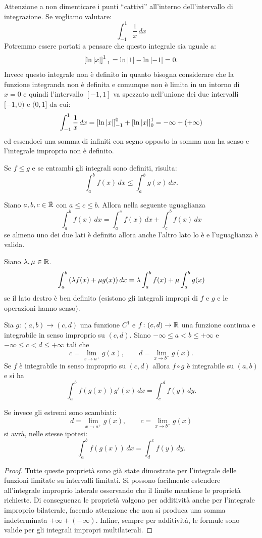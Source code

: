 \begin{remark}
Attenzione a non dimenticare i punti ``cattivi'' all'interno dell'intervallo
di integrazione. Se vogliamo valutare:
\[
  \int_{-1}^1 \frac{1}{x}\, dx
\]
Potremmo essere portati a pensare che questo integrale sia uguale a:
\[
 {\left[ \ln {\left|x\right|} \right]}_{-1}^1 = \ln {\left|1\right|} - \ln {\left|-1\right|} = 0.
\]
Invece questo integrale non è definito in quanto bisogna considerare
che la funzione integranda non è definita e comunque non è limita in un
intorno di $x=0$ e quindi l'intervallo $[-1,1]$ va spezzato nell'unione
dei due intervalli $[-1,0)$ e $(0,1]$ da cui:
\[
  \int_{-1}^1 \frac{1}{x}\, dx = {\left[ \ln {\left|x\right|} \right]}_{-1}^0 + {\left[ \ln{\left|x\right|} \right]}_0^{1}
   = -\infty + (+\infty)
\]
ed essendoci una somma di infiniti con segno opposto la somma non ha senso
e l'integrale improprio non è definito.
\end{remark}

\begin{theorem}
\label{th:proprieta_integrale_improprio}
Se $f\le g$ e se entrambi gli integrali sono definiti, risulta:
\[
  \int_a^b f(x)\, dx \le \int_a^b g(x)\, dx.
\]

Siano $a,b,c \in \bar {\mathbb R}$ con $a\le c \le b$.
Allora nella seguente uguaglianza
\[
  \int_a^b f(x)\, dx = \int_a^c f(x)\, dx + \int_c^b f(x)\, dx
\]
se almeno uno dei due lati è definito allora anche l'altro lato lo è e
l'uguaglianza è valida.

Siano $\lambda, \mu \in \mathbb R$.
\[
  \int_a^b {\left( \lambda f(x) + \mu g(x) \right)}\, dx
  = \lambda \int_a^b f(x) + \mu \int_a^b g(x)
\]
se il lato destro è ben definito (esistono gli integrali impropi di $f$ e $g$
e le operazioni hanno senso).

Sia $g\colon (a,b)\to (c,d)$ una funzione $C^1$
e $f\colon (c,d) \to \mathbb R$ una funzione continua
e integrabile in senso improprio su $(c,d)$.
Siano $-\infty \le a < b \le +\infty$ e
$-\infty \le c < d \le +\infty$ tali che
\[
c = \lim_{x\to a^+} g(x),
\qquad
d = \lim_{x\to b^-} g(x).
\]
Se $f$ è integrabile in senso improprio su $(c,d)$
allora $f\circ g$ è integrabile su $(a,b)$ e
si ha
\[
\int_a^b f(g(x)) g'(x)\, dx = \int_c^d f(y)\, dy.
\]

Se invece gli estremi sono scambiati:
\[
d = \lim_{x\to a^+} g(x),
\qquad
c = \lim_{x\to b^-} g(x)
\]
si avrà, nelle stesse ipotesi:
\[
  \int_a^b f(g(x))\, dx = \int_d^c f(y)\, dy.
\]
\end{theorem}
%
\begin{proof}
Tutte queste proprietà sono già state dimostrate per l'integrale delle funzioni
limitate su intervalli limitati. Si possono facilmente estendere all'integrale
improprio laterale osservando che il limite mantiene le proprietà richieste.
Di conseguenza le proprietà valgono per additività anche per l'integrale
improprio bilaterale, facendo attenzione che non si produca una somma
indeterminata $+\infty + (-\infty)$.
Infine, sempre per additività, le formule sono valide per gli integrali
impropri multilaterali.
\end{proof}

